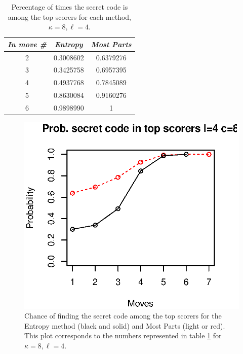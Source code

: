 \documentclass[preprint,12pt]{elsarticle}
\begin{document}
\begin{table}
\centering
\caption{Percentage of times the secret code is among the top scorers for
  each method, $\kappa=8, \ell=4$.\label{tab:top:me:48}}
\begin{tabular}{|c|c|c|}
\hline
\emph{In move \#} & \emph{Entropy} & \emph{Most Parts} \\
\hline
2 & 0.3008602  & 0.6379276 \\
3 & 0.3425758 & 0.6957395 \\
4 & 0.4937768 & 0.7845089 \\ 
5 & 0.8630084 & 0.9160276\\
6 & 0.9898990 & 1 \\
\hline
\end{tabular}
\end{table}
%
\begin{figure}[!htb]
\centering
\includegraphics{top-me-4-8.eps}
\caption{Chance of finding the secret code among the top scorers for the
  Entropy method (black and solid) and Most Parts (light or
  red). This plot corresponds to the numbers represented in table
  \ref{tab:top:me:48} for $\kappa=8, \ell=4$.\label{fig:top:me:48}}
\end{figure} 
%
\end{document}
